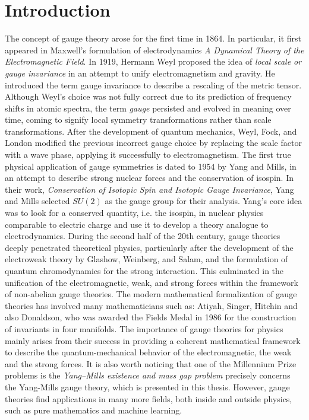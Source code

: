 \documentclass[12pt,a4paper]{report}
\theoremstyle{definition}
\theoremstyle{Theorem}
\theoremstyle{definition}
\theoremstyle{definition}
\begin{document}
	\chapter*{Introduction}
	The concept of gauge theory arose for the first time in 1864. In particular, it first appeared in Maxwell's formulation of electrodynamics \textit{A Dynamical Theory of the Electromagnetic Field}. 
	In 1919, Hermann Weyl proposed the idea of \textit{local scale or gauge invariance} in an attempt to unify electromagnetism and gravity. He introduced the term gauge invariance to describe a rescaling of the metric tensor. Although Weyl's choice was not fully correct due to its prediction of frequency shifts in atomic spectra, the term \textit{gauge} persisted and evolved in meaning over time, coming to signify local symmetry transformations rather than scale transformations.
	After the development of quantum mechanics, Weyl, Fock, and London modified the previous incorrect gauge choice by replacing the scale factor with a wave phase, applying it successfully to electromagnetism. The first true physical application of gauge symmetries is dated to 1954 by Yang and Mills, in an attempt to describe strong nuclear forces and the conservation of isospin. In their work, \textit{Conservation of Isotopic Spin and Isotopic Gauge Invariance}, Yang and Mills  selected $SU(2)$ as the gauge group for their analysis. Yang's core idea was to look for a conserved quantity, i.e. the isospin, in nuclear physics comparable to electric charge and use it to develop a theory analogue to electrodynamics. During the second half of the 20th century, gauge theories deeply penetrated theoretical physics, particularly after the development of the electroweak theory by Glashow, Weinberg, and Salam, and the formulation of quantum chromodynamics for the strong interaction. This culminated in the unification of the electromagnetic, weak, and strong forces within the framework of non-abelian gauge theories. The modern mathematical formalization of gauge theories has involved many mathematicians such as: Atiyah, Singer, Hitchin and also Donaldson, who was awarded the Fields Medal in 1986 for the construction of invariants in four manifolds.
	The importance of gauge theories for physics mainly arises from their success in providing a coherent mathematical framework to describe the quantum-mechanical behavior of the electromagnetic, the weak and the strong forces. It is also worth noticing that one of the Millennium Prize problems is the \textit{Yang–Mills existence and mass gap problem} precisely concerns the Yang-Mills gauge theory, which is presented in this thesis. However, gauge theories find applications in many more fields, both inside and outside physics, such as pure mathematics and machine learning. \\
\end{document}
